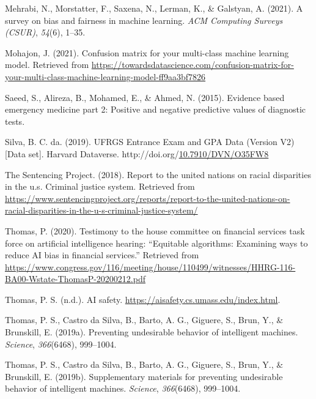 \documentclass[12pt, twoside]{amherstthesis}
\newenvironment{CSLReferences}[2]%
  {}%
  {\par}
\begin{document}
\begin{CSLReferences}{1}{0}
\leavevmode{}%
Mehrabi, N., Morstatter, F., Saxena, N., Lerman, K., \& Galstyan, A. (2021). A survey on bias and fairness in machine learning. \emph{ACM Computing Surveys (CSUR)}, \emph{54}(6), 1--35.

\leavevmode{}%
Mohajon, J. (2021). Confusion matrix for your multi-class machine learning model. Retrieved from \url{https://towardsdatascience.com/confusion-matrix-for-your-multi-class-machine-learning-model-ff9aa3bf7826}

\leavevmode{}%
Saeed, S., Alireza, B., Mohamed, E., \& Ahmed, N. (2015). Evidence based emergency medicine part 2: Positive and negative predictive values of diagnostic tests.

\leavevmode{}%
Silva, B. C. da. (2019). {UFRGS Entrance Exam and GPA Data} (Version V2) {[}Data set{]}. Harvard Dataverse. http://doi.org/\href{https://doi.org/10.7910/DVN/O35FW8}{10.7910/DVN/O35FW8}

\leavevmode{}%
The Sentencing Project. (2018). Report to the united nations on racial disparities in the u.s. Criminal justice system. Retrieved from \url{https://www.sentencingproject.org/reports/report-to-the-united-nations-on-racial-disparities-in-the-u-s-criminal-justice-system/}

\leavevmode{}%
Thomas, P. (2020). Testimony to the house committee on financial services task force on artificial intelligence hearing: {``Equitable algorithms: Examining ways to reduce AI bias in financial services.''} Retrieved from \url{https://www.congress.gov/116/meeting/house/110499/witnesses/HHRG-116-BA00-Wstate-ThomasP-20200212.pdf}

\leavevmode{}%
Thomas, P. S. (n.d.). AI safety. \url{https://aisafety.cs.umass.edu/index.html}.

\leavevmode{}%
Thomas, P. S., Castro da Silva, B., Barto, A. G., Giguere, S., Brun, Y., \& Brunskill, E. (2019a). Preventing undesirable behavior of intelligent machines. \emph{Science}, \emph{366}(6468), 999--1004.

\leavevmode{}%
Thomas, P. S., Castro da Silva, B., Barto, A. G., Giguere, S., Brun, Y., \& Brunskill, E. (2019b). Supplementary materials for preventing undesirable behavior of intelligent machines. \emph{Science}, \emph{366}(6468), 999--1004.

\end{CSLReferences}
\end{document}
